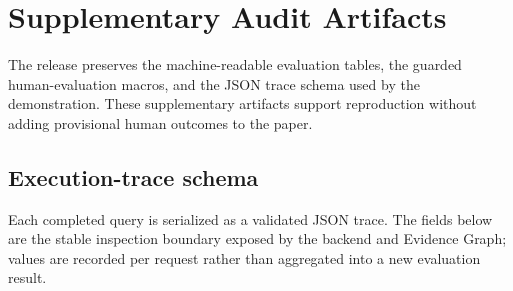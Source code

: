 \section{Supplementary Audit Artifacts}
\label{app:artifacts}

The release preserves the machine-readable evaluation tables, the guarded human-evaluation macros, and the JSON trace schema used by the demonstration. These supplementary artifacts support reproduction without adding provisional human outcomes to the paper.

\subsection{Execution-trace schema}
\label{app:trace-schema}

Each completed query is serialized as a validated JSON trace. The fields below are the stable inspection boundary exposed by the backend and Evidence Graph; values are recorded per request rather than aggregated into a new evaluation result.


